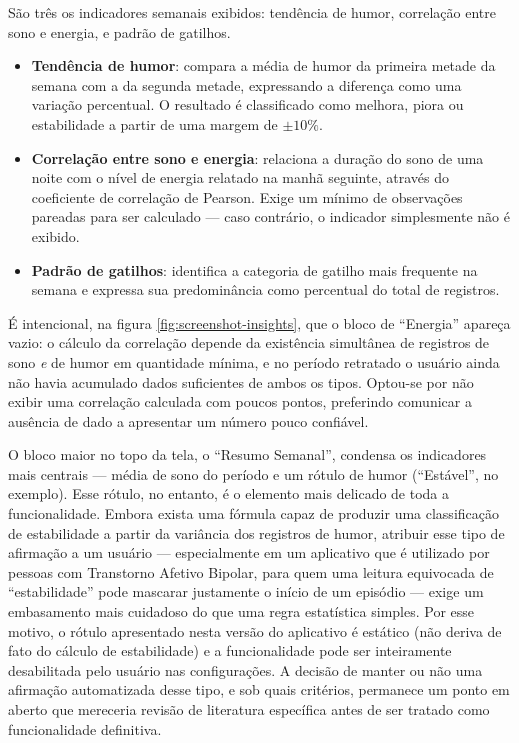
São três os indicadores semanais exibidos: tendência de humor, correlação
entre sono e energia, e padrão de gatilhos.

\begin{itemize}
    \item \textbf{Tendência de humor}: compara a média de humor da
    primeira metade da semana com a da segunda metade, expressando a
    diferença como uma variação percentual. O resultado é classificado
    como melhora, piora ou estabilidade a partir de uma margem de $\pm10\%$.

    \item \textbf{Correlação entre sono e energia}: relaciona a duração
    do sono de uma noite com o nível de energia relatado na manhã
    seguinte, através do coeficiente de correlação de Pearson. Exige um
    mínimo de observações pareadas para ser calculado — caso contrário,
    o indicador simplesmente não é exibido.

    \item \textbf{Padrão de gatilhos}: identifica a categoria de gatilho
    mais frequente na semana e expressa sua predominância como percentual
    do total de registros.
\end{itemize}

É intencional, na figura \ref{fig:screenshot-insights}, que o bloco de
``Energia'' apareça vazio: o cálculo da correlação depende da existência
simultânea de registros de sono \emph{e} de humor em quantidade mínima,
e no período retratado o usuário ainda não havia acumulado dados
suficientes de ambos os tipos. Optou-se por não exibir uma correlação
calculada com poucos pontos, preferindo comunicar a ausência de dado a
apresentar um número pouco confiável.

O bloco maior no topo da tela, o ``Resumo Semanal'', condensa os
indicadores mais centrais — média de sono do período e um rótulo de
humor (``Estável'', no exemplo). Esse rótulo, no entanto, é o elemento
mais delicado de toda a funcionalidade. Embora exista uma fórmula capaz
de produzir uma classificação de estabilidade a partir da variância dos
registros de humor, atribuir esse tipo de afirmação a um usuário —
especialmente em um aplicativo que é utilizado por pessoas com
Transtorno Afetivo Bipolar, para quem uma leitura equivocada de
``estabilidade'' pode mascarar justamente o início de um episódio —
exige um embasamento mais cuidadoso do que uma regra estatística
simples. Por esse motivo, o rótulo apresentado nesta versão do
aplicativo é estático (não deriva de fato do cálculo de estabilidade) e
a funcionalidade pode ser inteiramente desabilitada pelo usuário nas
configurações. A decisão de manter ou não uma afirmação automatizada
desse tipo, e sob quais critérios, permanece um ponto em aberto que
mereceria revisão de literatura específica antes de ser tratado como
funcionalidade definitiva.

